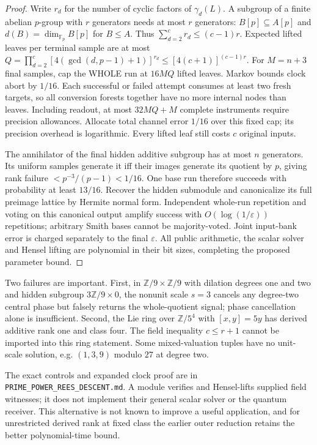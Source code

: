 \documentclass[11pt]{article}
\theoremstyle{remark}
\newcommand{\Fp}{\mathbb F_p}
\newcommand{\eps}{\varepsilon}
\begin{document}
\begin{proof}
Write $r_d$ for the number of cyclic factors of $\gamma_d(L)$. A subgroup
of a finite abelian $p$-group with $r$ generators needs at most $r$
generators: $B[p]\subseteq A[p]$ and $d(B)=\dim_{\Fp}B[p]$ for $B\le A$.
Thus $\sum_{d=2}^c r_d\le(c-1)r$. Expected lifted leaves per
terminal sample are at most
$Q=\prod_{d=2}^c[4(\gcd(d,p-1)+1)]^{r_d}\le[4(c+1)]^{(c-1)r}$.
For $M=n+3$ final samples, cap the WHOLE run at $16MQ$ lifted leaves.
Markov bounds clock abort by $1/16$. Each successful or failed attempt
consumes at least two fresh targets, so all conversion forests together
have no more internal nodes than leaves. Including readout, at most
$32MQ+M$ complete instruments require precision allowances. Allocate
total channel error $1/16$ over this fixed cap; its precision overhead is
logarithmic. Every lifted leaf still costs $c$ original inputs.

The annihilator of the final hidden additive subgroup has at most $n$
generators. Its uniform samples generate it iff their images generate
its quotient by $p$, giving rank failure $<p^{-3}/(p-1)<1/16$.
One base run therefore succeeds with probability at least $13/16$.
Recover the hidden submodule and canonicalize its full preimage lattice
by Hermite normal form. Independent whole-run repetition and voting on
this canonical output amplify success with $O(\log(1/\eps))$ repetitions;
arbitrary Smith bases cannot be majority-voted. Joint input-bank error
is charged separately to the final $\eps$. All public arithmetic, the
scalar solver and Hensel lifting are polynomial in their bit sizes,
completing the proposed parameter bound.
\end{proof}

Two failures are important. First, in $\mathbb Z/9\times\mathbb Z/9$
with dilation degrees one and two and hidden subgroup $3\mathbb Z/9\times0$,
the nonunit scale $s=3$ cancels any degree-two central phase but falsely
returns the whole-quotient signal; phase cancellation alone is insufficient.
Second, the Lie ring over $\mathbb Z/5^4$ with $[x,y]=5y$ has derived
additive rank one and class four. The field inequality $c\le r+1$ cannot
be imported into this ring statement. Some mixed-valuation tuples have no
unit-scale solution, e.g. $(1,3,9)$ modulo $27$ at degree two.

The exact controls and expanded clock proof are in
\texttt{PRIME\_POWER\_REES\_DESCENT.md}. A module verifies and Hensel-lifts
supplied field witnesses; it does not implement their general scalar solver
or the quantum receiver. This alternative is not known to improve a useful
application, and for unrestricted derived rank at fixed class the earlier
outer reduction retains the better polynomial-time bound.
\end{document}
